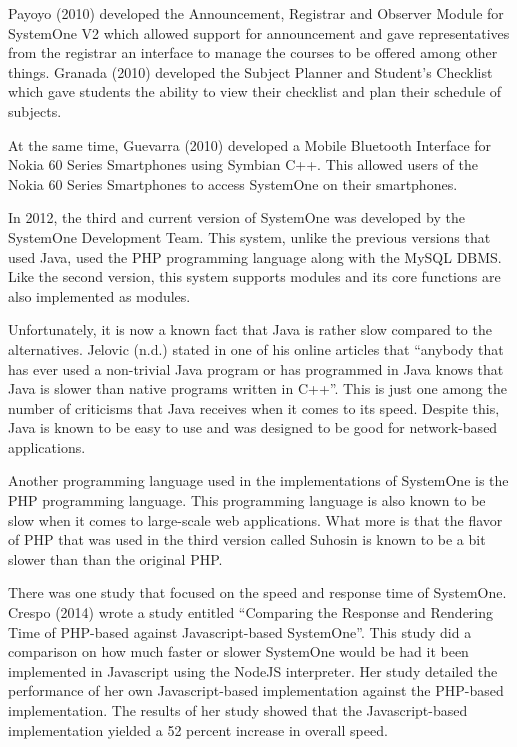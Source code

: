 \documentclass{sigchi}
\begin{document}
Payoyo (2010) developed the Announcement, Registrar and Observer Module for
SystemOne V2 which allowed support for announcement and gave representatives from the
registrar an interface to manage the courses to be offered among other things. Granada (2010)
developed the Subject Planner and Student’s Checklist which gave students the ability to view
their checklist and plan their schedule of subjects.

At the same time, Guevarra (2010) developed a Mobile Bluetooth Interface for Nokia 60
Series Smartphones using Symbian C++. This allowed users of the Nokia 60 Series Smartphones
to access SystemOne on their smartphones.

In 2012, the third and current version of SystemOne was developed by the SystemOne
Development Team. This system, unlike the previous versions that used Java, used the PHP
programming language along with the MySQL DBMS. Like the second version, this system
supports modules and its core functions are also implemented as modules.

Unfortunately, it is now a known fact that Java is rather slow compared to the alternatives.
Jelovic (n.d.) stated in one of his online articles that “anybody that has ever used a non-trivial
Java program or has programmed in Java knows that Java is slower than native programs written
in C++”. This is just one among the number of criticisms that Java receives when it comes to its
speed. Despite this, Java is known to be easy to use and was designed to be good for
network-based applications.

Another programming language used in the implementations of SystemOne is the PHP
programming language. This programming language is also known to be slow when it comes to
large-scale web applications. What more is that the flavor of PHP that was used in the third
version called Suhosin is known to be a bit slower than than the original PHP.

There was one study that focused on the speed and response time of SystemOne. Crespo
(2014) wrote a study entitled “Comparing the Response and Rendering Time of PHP-based
against Javascript-based SystemOne”. This study did a comparison on how much faster or slower
SystemOne would be had it been implemented in Javascript using the NodeJS interpreter. Her
study detailed the performance of her own Javascript-based implementation against the
PHP-based implementation. The results of her study showed that the Javascript-based
implementation yielded a 52 percent increase in overall speed.
\end{document}
